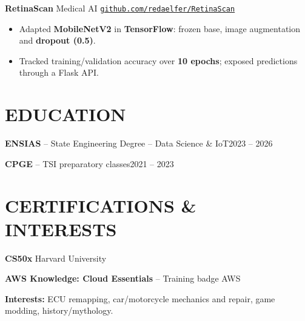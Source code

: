 \documentclass[11pt,a4paper]{article}
\newcommand{\entry}[2]{\noindent #1\hfill #2\par}
\newcommand{\jobgap}{\vspace{5pt}}
\begin{document}
\jobgap
\textbf{RetinaScan} \textbar{} Medical AI \textbar{} \href{https://github.com/redaelfer/RetinaScan}{\nolinkurl{github.com/redaelfer/RetinaScan}}\par
\begin{itemize}
  \item Adapted \textbf{MobileNetV2} in \textbf{TensorFlow}: frozen base, image augmentation and \textbf{dropout (0.5)}.
  \item Tracked training/validation accuracy over \textbf{10 epochs}; exposed predictions through a Flask API.
\end{itemize}

\section*{EDUCATION}
\entry{\textbf{ENSIAS} -- State Engineering Degree -- Data Science \& IoT}{2023 -- 2026}
\vspace{3pt}
\entry{\textbf{CPGE} -- TSI preparatory classes}{2021 -- 2023}

\section*{CERTIFICATIONS \& INTERESTS}
\textbf{CS50x} \textbar{} Harvard University\par
\vspace{3pt}
\textbf{AWS Knowledge: Cloud Essentials} -- Training badge \textbar{} AWS\par

\vspace{5pt}
\textbf{Interests:} ECU remapping, car/motorcycle mechanics and repair, game modding, history/mythology.
\end{document}
